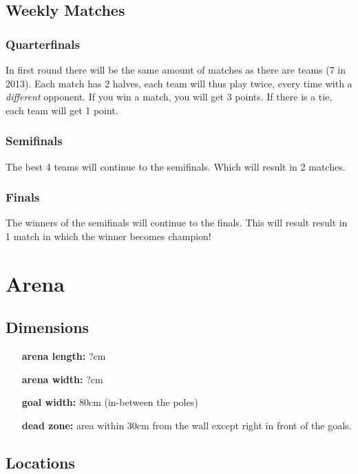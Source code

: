 \documentclass[a4paper, 12pt, oneside]{article}
\begin{document}
\subsection{Weekly Matches}

\subsubsection{Quarterfinals}

In first round there will be the same amount of matches as there are teams (7 in 2013).
Each match has 2 halves, each team will thus play twice, every time with a \emph{different} opponent.
If you win a match, you will get 3 points. If there is a tie, each team will get 1 point.

\subsubsection{Semifinals}

The best 4 teams will continue to the semifinals.
Which will result in 2 matches.

\subsubsection{Finals}

The winners of the semifinals will continue to the finals.
This will result result in 1 match in which the winner becomes champion!

\section{Arena}

\subsection{Dimensions} 
\label{sec:dimensions}

\begin{enumerate}
    \item[\textbf{arena length:}] ?cm
    \item[\textbf{arena width:}] ?cm
    \item[\textbf{goal width:}] 80cm (in-between the poles)
    \item[\textbf{dead zone:}] area within 30cm from the wall except right in front of the goals.
\end{enumerate}

\subsection{Locations}
\end{document}
